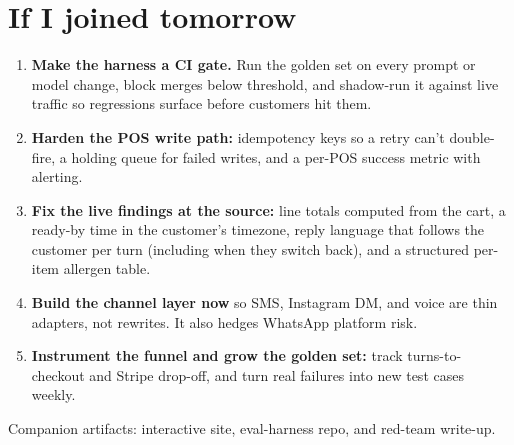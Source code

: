 \documentclass[11pt]{article}
\begin{document}
\section{If I joined tomorrow}

\begin{enumerate}[leftmargin=2.2em,itemsep=3pt]
\item \textbf{Make the harness a CI gate.} Run the golden set on every prompt or model change, block merges below threshold, and shadow-run it against live traffic so regressions surface before customers hit them.
\item \textbf{Harden the POS write path:} idempotency keys so a retry can't double-fire, a holding queue for failed writes, and a per-POS success metric with alerting.
\item \textbf{Fix the live findings at the source:} line totals computed from the cart, a ready-by time in the customer's timezone, reply language that follows the customer per turn (including when they switch back), and a structured per-item allergen table.
\item \textbf{Build the channel layer now} so SMS, Instagram DM, and voice are thin adapters, not rewrites. It also hedges WhatsApp platform risk.
\item \textbf{Instrument the funnel and grow the golden set:} track turns-to-checkout and Stripe drop-off, and turn real failures into new test cases weekly.
\end{enumerate}

\vspace{6pt}
\begin{center}\small\color{ink2}
Companion artifacts: interactive site, eval-harness repo, and red-team write-up.
\end{center}
\end{document}
